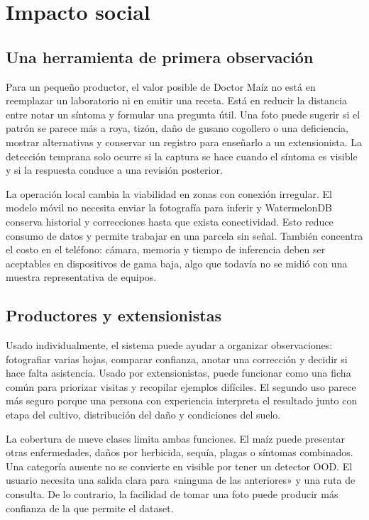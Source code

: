 \section{Impacto social}

\subsection{Una herramienta de primera observación}

Para un pequeño productor, el valor posible de Doctor Maíz no está en reemplazar
un laboratorio ni en emitir una receta. Está en reducir la distancia entre
notar un síntoma y formular una pregunta útil. Una foto puede sugerir si el
patrón se parece más a roya, tizón, daño de gusano cogollero o una deficiencia,
mostrar alternativas y conservar un registro para enseñarlo a un extensionista.
La detección temprana solo ocurre si la captura se hace cuando el síntoma es
visible y si la respuesta conduce a una revisión posterior.

La operación local cambia la viabilidad en zonas con conexión irregular. El
modelo móvil no necesita enviar la fotografía para inferir y WatermelonDB
conserva historial y correcciones hasta que exista conectividad. Esto reduce
consumo de datos y permite trabajar en una parcela sin señal. También concentra
el costo en el teléfono: cámara, memoria y tiempo de inferencia deben ser
aceptables en dispositivos de gama baja, algo que todavía no se midió con una
muestra representativa de equipos.

\subsection{Productores y extensionistas}

Usado individualmente, el sistema puede ayudar a organizar observaciones:
fotografiar varias hojas, comparar confianza, anotar una corrección y decidir
si hace falta asistencia. Usado por extensionistas, puede funcionar como una
ficha común para priorizar visitas y recopilar ejemplos difíciles. El segundo
uso parece más seguro porque una persona con experiencia interpreta el
resultado junto con etapa del cultivo, distribución del daño y condiciones del
suelo.

La cobertura de nueve clases limita ambas funciones. El maíz puede presentar
otras enfermedades, daños por herbicida, sequía, plagas o síntomas combinados.
Una categoría ausente no se convierte en visible por tener un detector OOD.
El usuario necesita una salida clara para «ninguna de las anteriores» y una
ruta de consulta. De lo contrario, la facilidad de tomar una foto puede
producir más confianza de la que permite el dataset.

